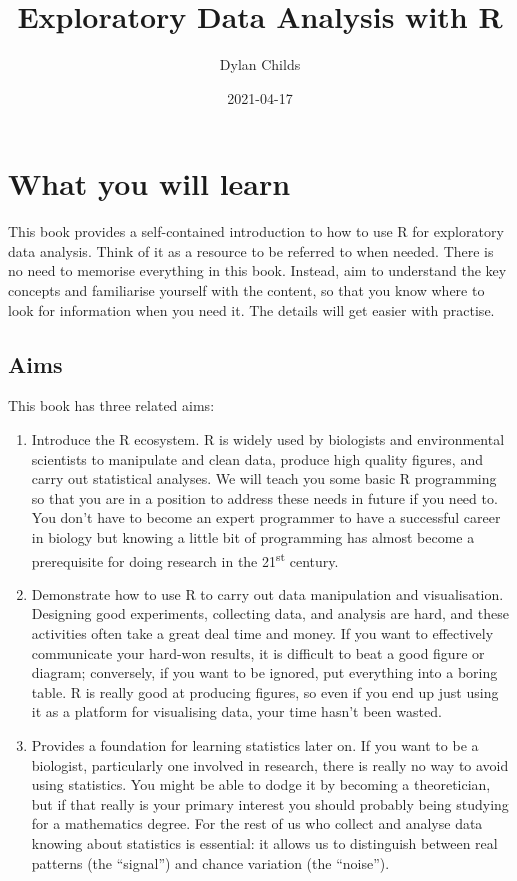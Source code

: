 \documentclass[
]{book}
\title{Exploratory Data Analysis with R}
\author{Dylan Childs}
\date{2021-04-17}
\begin{document}
\maketitle

{
\setcounter{tocdepth}{1}
\tableofcontents
}
\hypertarget{what-you-will-learn}{%
\chapter*{What you will learn}\label{what-you-will-learn}}

This book provides a self-contained introduction to how to use R for exploratory data analysis. Think of it as a resource to be referred to when needed. There is no need to memorise everything in this book. Instead, aim to understand the key concepts and familiarise yourself with the content, so that you know where to look for information when you need it. The details will get easier with practise.

\hypertarget{aims}{%
\section*{Aims}\label{aims}}

This book has three related aims:

\begin{enumerate}
\def\labelenumi{\arabic{enumi}.}
\item
  Introduce the R ecosystem. R is widely used by biologists and environmental scientists to manipulate and clean data, produce high quality figures, and carry out statistical analyses. We will teach you some basic R programming so that you are in a position to address these needs in future if you need to. You don't have to become an expert programmer to have a successful career in biology but knowing a little bit of programming has almost become a prerequisite for doing research in the 21\textsuperscript{st} century.
\item
  Demonstrate how to use R to carry out data manipulation and visualisation. Designing good experiments, collecting data, and analysis are hard, and these activities often take a great deal time and money. If you want to effectively communicate your hard-won results, it is difficult to beat a good figure or diagram; conversely, if you want to be ignored, put everything into a boring table. R is really good at producing figures, so even if you end up just using it as a platform for visualising data, your time hasn't been wasted.
\item
  Provides a foundation for learning statistics later on. If you want to be a biologist, particularly one involved in research, there is really no way to avoid using statistics. You might be able to dodge it by becoming a theoretician, but if that really is your primary interest you should probably being studying for a mathematics degree. For the rest of us who collect and analyse data knowing about statistics is essential: it allows us to distinguish between real patterns (the ``signal'') and chance variation (the ``noise'').
\end{enumerate}
\end{document}
